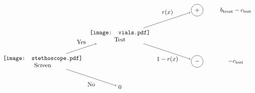 \documentclass[10pt]{article}
\begin{document}
\[\begin{tikzpicture}[scale=1.5]
  \node[align=center] (screen)    at (0,   0) {\texttt{[image: stethoscope.pdf]}\\Screen};
  \node               (screen-no) at (3,  -1) {0};
  \node[align=center] (test)      at (3,   1) {\texttt{[image: vials.pdf]}\\Test};
  \node[draw, circle] (test-pos)  at (6,   2) {$+$};
  \node[draw, circle] (test-neg)  at (6,   0) {$-$};
  \node               (util-neg)  at (7.5, 0) {$-c_{\text{test}}$};
  \node               (util-neg)  at (7.5, 2) {$b_{\text{treat}}-c_{\text{test}}$};
  \draw[->]                 (screen) -- node[below, yshift=-1ex] {No}       (screen-no);
  \draw[->]                 (screen) -- node[above, yshift= 1ex] {Yes}      (test);
  \draw[->, shorten >= 2px] (test)   -- node[below, yshift=-1ex] {$1-r(x)$} (test-neg);
  \draw[->, shorten >= 2px] (test)   -- node[above, yshift= 1ex] {$r(x)$}   (test-pos);
\end{tikzpicture}\]
\end{document}
